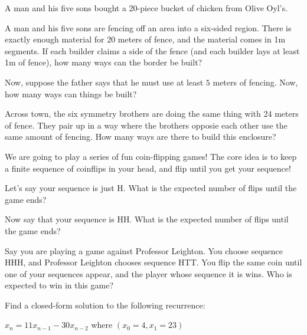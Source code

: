 \documentclass[12pt,oneside]{article}
\begin{document}
\newpage
\begin{problem}{10}
\bparts
{}

A man and his five sons bought a 20-piece bucket of chicken from Olive Oyl's.  

A man and his five sons are fencing off an area into a six-sided region.  There is exactly enough material for $20$ meters of fence, and the material comes in 1m segments.  
If each builder claims a side of the fence (and each builder lays at least 1m of fence), how many ways can the border be built?


Now, suppose the father says that he must use at least $5$ meters of fencing.  Now, how many ways can things be built?


Across town, the six symmetry brothers are doing the same thing with $24$ meters of fence.  They pair up in a way where the brothers opposie each other use the same amount
of fencing.  How many ways are there to build this enclosure?

\eparts
\end{problem}

\newpage
\begin{problem}{15}
We are going to play a series of fun coin-flipping games!  The core idea is to keep a finite sequence of coinflips in your head, and flip until you get your sequence!

\bparts

Let's say your sequence is just H.  What is the expected number of flips until the game ends?

Now say that your sequence is HH.  What is the expected number of flips until the game ends?

Say you are playing a game against Professor Leighton.  You choose sequence HHH, and Professor Leighton chooses sequence HTT.  You flip the same coin until one of your sequences
appear, and the player whose sequence it is wins.  Who is expected to win in this game?

\eparts

\end{problem}

\newpage

\begin{problem}{10}

Find a closed-form solution to the following recurrence: 

$x_n = 11x_{n-1} - 30x_{n-2}$ where $(x_0 =4, x_1 = 23)$
\end{problem}
\end{document}
